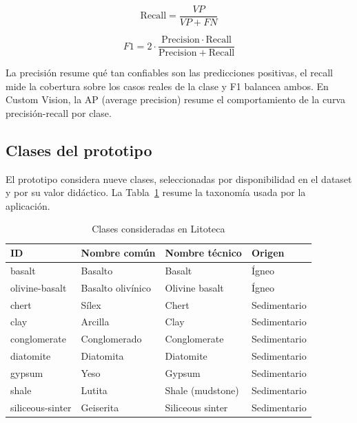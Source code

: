 \begin{equation}
  \mathrm{Recall} = \frac{VP}{VP + FN}
  \label{eq:recall}
\end{equation}

\begin{equation}
  F1 = 2 \cdot \frac{\mathrm{Precision} \cdot \mathrm{Recall}}{\mathrm{Precision} + \mathrm{Recall}}
  \label{eq:f1}
\end{equation}

La precisión resume qué tan confiables son las predicciones positivas, el recall
mide la cobertura sobre los casos reales de la clase y F1 balancea ambos. En Custom
Vision, la AP (average precision) resume el comportamiento de la curva
precisión-recall por clase.

\subsection{Clases del prototipo}

El prototipo considera nueve clases, seleccionadas por disponibilidad en el dataset
y por su valor didáctico. La Tabla~\ref{tab:clases} resume la taxonomía usada por
la aplicación.

\begin{table}[H]
  \centering
  \caption{Clases consideradas en Litoteca}
  \label{tab:clases}
  \begin{tabular}{@{}llll@{}}
    \toprule
    ID & Nombre común & Nombre técnico & Origen \\
    \midrule
    basalt & Basalto & Basalt & Ígneo \\
    olivine-basalt & Basalto olivínico & Olivine basalt & Ígneo \\
    chert & Sílex & Chert & Sedimentario \\
    clay & Arcilla & Clay & Sedimentario \\
    conglomerate & Conglomerado & Conglomerate & Sedimentario \\
    diatomite & Diatomita & Diatomite & Sedimentario \\
    gypsum & Yeso & Gypsum & Sedimentario \\
    shale & Lutita & Shale (mudstone) & Sedimentario \\
    siliceous-sinter & Geiserita & Siliceous sinter & Sedimentario \\
    \bottomrule
  \end{tabular}
\end{table}
